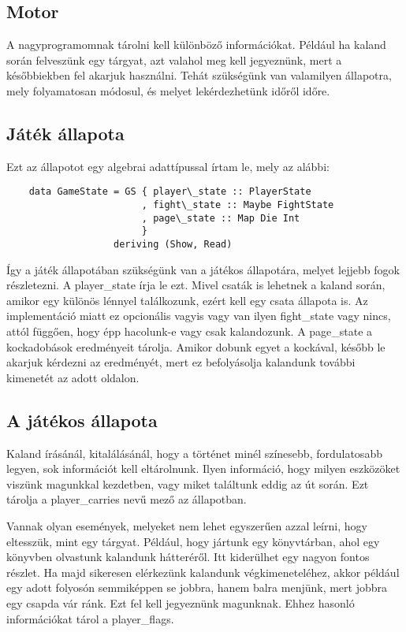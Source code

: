 \documentclass[12pt,a4paper,oneside]{report}
\begin{document}
    \subsection{Motor}
    A nagyprogramomnak tárolni kell különböző információkat. Például ha
    kaland során felveszünk egy tárgyat, azt valahol meg kell jegyeznünk, mert a
    későbbiekben fel akarjuk használni. Tehát szükségünk van valamilyen
    állapotra, mely folyamatosan módosul, és melyet lekérdezhetünk
    időről időre.
    \subsection{Játék állapota}
    Ezt az állapotot egy algebrai adattípussal írtam le, mely az
    alábbi:
    \begin{verbatim}
    data GameState = GS { player\_state :: PlayerState
                        , fight\_state :: Maybe FightState
                        , page\_state :: Map Die Int
                        }
                   deriving (Show, Read)
    \end{verbatim}
    Így a játék állapotában szükségünk van a játékos állapotára, melyet
    lejjebb fogok részletezni. A player\_state írja le ezt. Mivel csaták is lehetnek a kaland során, amikor
    egy különös lénnyel találkozunk, ezért kell egy csata állapota
    is. Az implementáció miatt ez opcionális vagyis vagy van ilyen
    fight\_state vagy nincs, attól függően, hogy épp hacolunk-e vagy
    csak kalandozunk. A page\_state a kockadobások eredményeit
    tárolja. Amikor dobunk egyet a kockával, később le akarjuk
    kérdezni az eredményét, mert ez befolyásolja kalandunk további
    kimenetét az adott oldalon.
    
    \subsection{A játékos állapota}
    Kaland írásánál, kitalálásánál, hogy a történet minél színesebb,
    fordulatosabb legyen, sok információt kell eltárolnunk. Ilyen
    információ, hogy milyen eszközöket viszünk magunkkal kezdetben,
    vagy miket találtunk eddig az út során.  Ezt tárolja a
    player\_carries nevű mező az állapotban.

    Vannak olyan események, melyeket nem lehet egyszerűen azzal
    leírni, hogy eltesszük, mint egy tárgyat. Például, hogy jártunk
    egy könyvtárban, ahol egy könyvben olvastunk kalandunk hátteréről.
    Itt kiderülhet egy nagyon fontos részlet. Ha majd sikeresen elérkezünk
    kalandunk végkimeneteléhez, akkor például egy adott folyosón
    semmiképpen se jobbra, hanem balra menjünk, mert jobbra egy csapda
    vár ránk. Ezt fel kell jegyeznünk magunknak. Ehhez hasonló
    információkat tárol a player\_flags.
\end{document}
